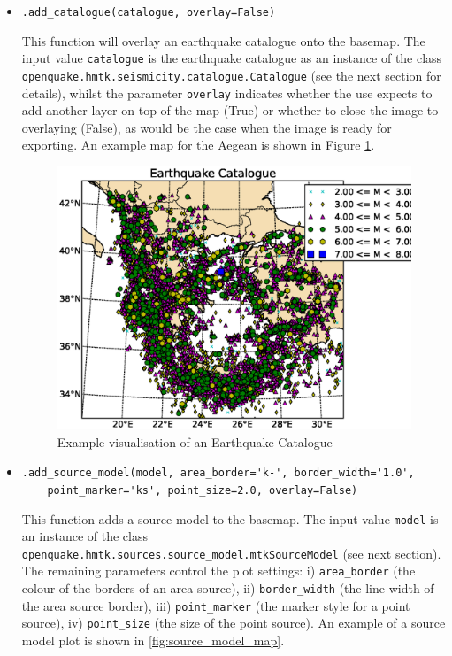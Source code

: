 \begin{itemize}
\item \verb;.add_catalogue(catalogue, overlay=False);

This function will overlay an earthquake catalogue onto the basemap. The input value \verb=catalogue= is the earthquake catalogue as an instance of the class \\\verb=openquake.hmtk.seismicity.catalogue.Catalogue= (see the next section for details), whilst the parameter \verb=overlay= indicates whether the use expects to add another layer on top of the map (True) or whether to close the image to overlaying (False), as would be the case when the image is ready for exporting. An example map for the Aegean is shown in Figure \ref{fig:eqcat_simple}.
   
\begin{figure}[htb]
  \centering
      \includegraphics[trim=20mm 14mm 1mm 1mm, clip, width=\textwidth]{./figures/EQCatalogueSimple.eps}
  \caption{Example visualisation of an Earthquake Catalogue}
  \label{fig:eqcat_simple}
\end{figure}

\item \verb;.add_source_model(model, area_border='k-', border_width='1.0',;\\
    \verb;    point_marker='ks', point_size=2.0, overlay=False);

This function adds a source model to the basemap. The input value \verb=model= is an instance of the class \verb=openquake.hmtk.sources.source_model.mtkSourceModel= (see next section). The remaining parameters control the plot settings: i) \verb=area_border= (the colour of the borders of an area source), ii) \verb=border_width= (the line width of the area source border), iii) \verb=point_marker= (the marker style for a point source), iv) \verb=point_size= (the size of the point source). An example of a source model plot is shown in \ref{fig:source_model_map}.
 

\end{itemize}
